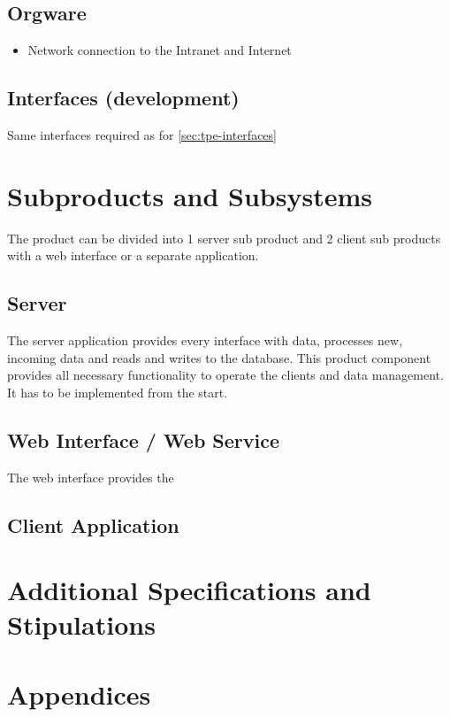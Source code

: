 \documentclass[11pt,a4paper,oneside,svgnames]{report}
\begin{document}
\section{Orgware}
	\begin{itemize}
		\item Network connection to the Intranet and Internet
	\end{itemize}
\section{Interfaces (development)}
Same interfaces required as for \ref{sec:tpe-interfaces}

\chapter{Subproducts and Subsystems}
The product can be divided into 1 server sub product and 2 client sub products with a web interface or a separate application.

\section{Server}
The server application provides every interface with data, processes new, incoming data and reads and writes to the database. This product component provides all necessary functionality to operate the clients and data management. It has to be implemented from the start.

\section{Web Interface / Web Service}
The web interface provides the 

\section{Client Application}

\chapter{Additional Specifications and Stipulations}
\chapter{Appendices}
\printglossaries
\end{document}
